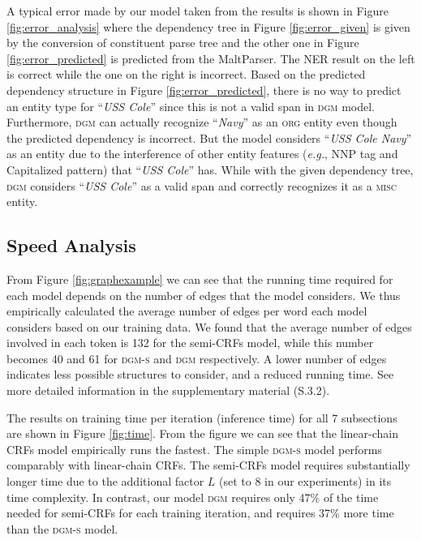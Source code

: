 A typical error made by our model taken from the results is shown in Figure \ref{fig:error_analysis} where the dependency tree in Figure \ref{fig:error_given} is given by the conversion of constituent parse tree and the other one in Figure \ref{fig:error_predicted} is predicted from the MaltParser. 
The NER result on the left is correct while the one on the right is incorrect. 
Based on the predicted dependency structure in Figure \ref{fig:error_predicted}, there is no way to predict an entity type for ``{\em USS Cole}'' since this is not a valid span in \textsc{dgm} model. 
Furthermore, \textsc{dgm} can actually recognize ``{\em Navy}'' as an \textsc{org} entity even though the predicted dependency is incorrect. 
But the model considers ``{\em USS Cole Navy}'' as an entity due to the interference of other entity features ({\em e.g.}, NNP tag and Capitalized pattern) that ``{\em USS Cole}'' has. 
While with the given dependency tree, \textsc{dgm} considers ``{\em USS Cole}'' as a valid span and correctly recognizes it as a \textsc{misc} entity. 


\subsection{Speed Analysis}
From Figure \ref{fig:graphexample} we can see that the running time required for each model depends on the number of edges that the model considers.
We thus empirically calculated the average number of edges per word each model considers based on our training data.
We found that the average number of edges involved in each token is 132 for the semi-CRFs model,
while this number becomes 40 and 61 for \textsc{dgm-s} and \textsc{dgm} respectively.
A lower number of edges indicates less possible structures to consider, and a reduced running time.
See more detailed information  in the supplementary material (S.3.2).

The results on training time per iteration (inference time) for all 7 subsections are shown in Figure \ref{fig:time}. 
From the figure we can see that the linear-chain CRFs model empirically runs the fastest.
The simple \textsc{dgm-s} model performs comparably with linear-chain CRFs.
The semi-CRFs model requires substantially longer time due to the additional factor $L$ (set to 8 in our experiments) in its time complexity.
In contrast, our model \textsc{dgm} requires only 47\% of the time needed for semi-CRFs for each training iteration, and requires 37\% more time than the \textsc{dgm-s} model.

